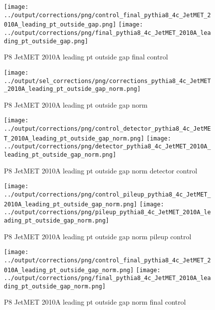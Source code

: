 \documentclass[11pt]{book}
\begin{document}
\begin{figure}[ht]
\centering
\texttt{[image: ../output/corrections/png/control\_final\_pythia8\_4c\_JetMET\_2010A\_leading\_pt\_outside\_gap.png]}
\texttt{[image: ../output/corrections/png/final\_pythia8\_4c\_JetMET\_2010A\_leading\_pt\_outside\_gap.png]}
\caption{P8 JetMET 2010A leading pt outside gap final control}
\label{fig:p8_JetMET_2010A_leading_pt_outside_gap_final_control}
\end{figure}



\begin{figure}[ht]
\centering
\texttt{[image: ../output/sel\_corrections/png/corrections\_pythia8\_4c\_JetMET\_2010A\_leading\_pt\_outside\_gap\_norm.png]}
\caption{P8 JetMET 2010A leading pt outside gap norm}
\label{fig:p8_JetMET_2010A_leading_pt_outside_gap_norm}
\end{figure}

\begin{figure}[ht]
\centering
\texttt{[image: ../output/corrections/png/control\_detector\_pythia8\_4c\_JetMET\_2010A\_leading\_pt\_outside\_gap\_norm.png]}
\texttt{[image: ../output/corrections/png/detector\_pythia8\_4c\_JetMET\_2010A\_leading\_pt\_outside\_gap\_norm.png]}
\caption{P8 JetMET 2010A leading pt outside gap norm detector control}
\label{fig:p8_JetMET_2010A_leading_pt_outside_gap_norm_detector_control}
\end{figure}

\begin{figure}[ht]
\centering
\texttt{[image: ../output/corrections/png/control\_pileup\_pythia8\_4c\_JetMET\_2010A\_leading\_pt\_outside\_gap\_norm.png]}
\texttt{[image: ../output/corrections/png/pileup\_pythia8\_4c\_JetMET\_2010A\_leading\_pt\_outside\_gap\_norm.png]}
\caption{P8 JetMET 2010A leading pt outside gap norm pileup control}
\label{fig:p8_JetMET_2010A_leading_pt_outside_gap_norm_pileup_control}
\end{figure}


\begin{figure}[ht]
\centering
\texttt{[image: ../output/corrections/png/control\_final\_pythia8\_4c\_JetMET\_2010A\_leading\_pt\_outside\_gap\_norm.png]}
\texttt{[image: ../output/corrections/png/final\_pythia8\_4c\_JetMET\_2010A\_leading\_pt\_outside\_gap\_norm.png]}
\caption{P8 JetMET 2010A leading pt outside gap norm final control}
\label{fig:p8_JetMET_2010A_leading_pt_outside_gap_norm_final_control}
\end{figure}
\end{document}
